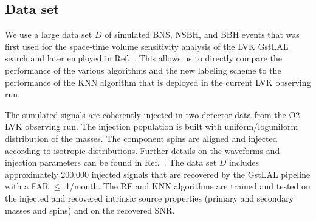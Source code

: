 \subsection{Data set} \label{dataset}

We use a large data set $D$ of simulated \ac{BNS}, \ac{NSBH}, and \ac{BBH} events that was first used for the space-time volume sensitivity analysis of the \ac{LVK} GstLAL search
 and later employed in Ref.~\cite{Chatterjee:2019avs}. This allows us to directly compare the performance of the various algorithms and the new labeling
scheme to the performance of the \ac{KNN} algorithm that is deployed in the current \ac{LVK} observing run. 

The simulated signals are coherently injected in two-detector data from the \ac{O2} \ac{LVK} observing run. The injection population is built with uniform/loguniform  distribution of the  masses. The component spins are aligned and injected according to isotropic
distributions. Further details on the waveforms and injection parameters can be found in Ref.~\cite{Chatterjee:2019avs}. The data set $D$ includes approximately 200,000 injected signals
that are recovered by the GstLAL pipeline with a \ac{FAR} $\le$ 1/month. The \ac{RF} and \ac{KNN} algorithms are trained and tested on the injected and recovered intrinsic source
properties (primary and secondary masses and spins) and on the recovered \ac{SNR}. 

